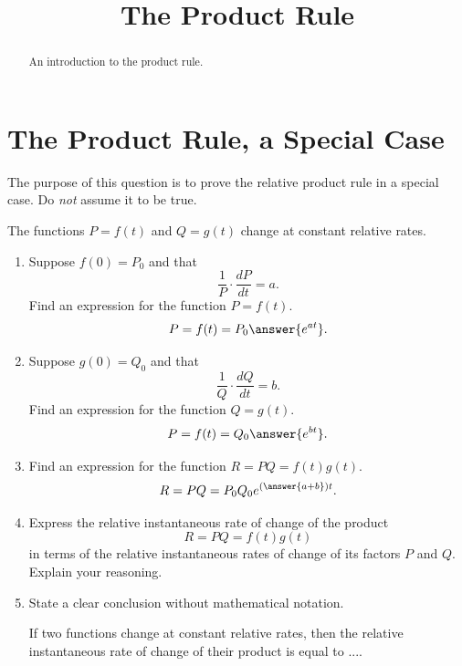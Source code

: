 \documentclass{ximera}
\title{The Product Rule}
\begin{document}
\begin{abstract}
An introduction to the product rule.
\end{abstract}
\maketitle


\section{The Product Rule, a Special Case}

\begin{question} \label{Q23mcm32}
The purpose of this question is to prove the relative product rule in a special case. Do \emph{not} assume it to be true.

The functions $P=f(t)$ and $Q=g(t)$ change at constant relative rates. 

\begin{enumerate}

\item Suppose $f(0)=P_0$ and that
\[
   \frac{1}{P} \cdot \frac{dP}{dt} = a. 
\]
Find an expression for the function $P=f(t)$.
\[
    P = f(t) = P_0 \answer{e^{at}} .
\]

\item Suppose $g(0)=Q_0$ and that
\[
   \frac{1}{Q} \cdot \frac{dQ}{dt} = b. 
\]
Find an expression for the function $Q=g(t)$.
\[
    P = f(t) = Q_0 \answer{e^{bt}} .
\]

\item Find an expression for the function $R = PQ = f(t)g(t)$.
\[
      R = PQ = P_0Q_0e^{(\answer{a+b})t} .
\]

\item Express the relative instantaneous rate of change of the product 
\[
  R=PQ = f(t)g(t)
\]
in terms of the relative instantaneous rates of change of its factors $P$ and $Q$. Explain your reasoning.

\item State a clear conclusion without mathematical notation. 

If two functions change at constant relative rates, then the relative instantaneous rate of change of their product is equal to ....

\begin{freeResponse}
\end{freeResponse}
\end{enumerate}

\end{question}
\end{document}
